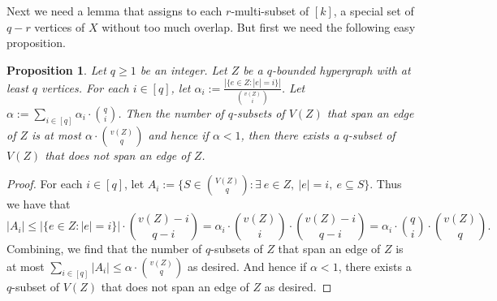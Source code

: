 \documentclass[11pt]{article}
\newcounter{i}
\theoremstyle{plain}
\newtheorem{proposition}[thm]{Proposition}
\theoremstyle{plain} %
\theoremstyle{definition}
\begin{document}
Next we need a lemma that assigns to each $r$-multi-subset of $[k]$, a special set of $q-r$ vertices of $X$ without too much overlap. But first we need the following easy proposition.

\begin{proposition}\label{prop:NonUniformTuran}
Let $q\ge 1$ be an integer. Let $Z$ be a $q$-bounded hypergraph with at least $q$ vertices. For each $i\in [q]$, let $\alpha_i := \frac{|\{e\in Z: |e|=i\}|}{\binom{v(Z)}{i}}$.
Let $\alpha := \sum_{i\in [q]} \alpha_i \cdot \binom{q}{i}$.
Then the number of $q$-subsets of $V(Z)$ that span an edge of $Z$ is at most $\alpha \cdot \binom{v(Z)}{q}$ and hence if $\alpha < 1$, then there exists a $q$-subset of $V(Z)$ that does not span an edge of $Z$.
\end{proposition}
\begin{proof}
For each $i\in [q]$, let $A_i:= \{ S\in \binom{V(Z)}{q}: \exists~e\in Z,~|e|=i,~e\subseteq S\}$. Thus we have that
$$|A_i| \le |\{e\in Z: |e|=i\}|\cdot \binom{v(Z)-i}{q-i}= \alpha_i \cdot \binom{v(Z)}{i} \cdot \binom{v(Z)-i}{q-i} = \alpha_i \cdot \binom{q}{i} \cdot \binom{v(Z)}{q}.$$
Combining, we find that the number of $q$-subsets of $Z$ that span an edge of $Z$ is at most $\sum_{i\in [q]} |A_i| \le \alpha\cdot \binom{v(Z)}{q}$ as desired. And hence if $\alpha < 1$, there exists a $q$-subset of $V(Z)$ that does not span an edge of $Z$ as desired.
\end{proof}
\end{document}
